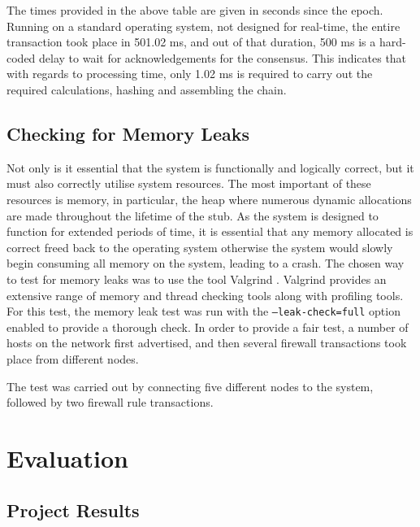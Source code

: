 \documentclass[a4paper, 11pt]{report}
\begin{document}
The times provided in the above table are given in seconds since the epoch. Running on a standard operating system, not designed for real-time, the entire transaction took place in 501.02 ms, and out of that duration, 500 ms is a hard-coded delay to wait for acknowledgements for the consensus. This indicates that with regards to processing time, only 1.02 ms is required to carry out the required calculations, hashing and assembling the chain.

\section{Checking for Memory Leaks}
Not only is it essential that the system is functionally and logically correct, but it must also correctly utilise system resources. The most important of these resources is memory, in particular, the heap where numerous dynamic allocations are made throughout the lifetime of the \gls{stub}. As the system is designed to function for extended periods of time, it is essential that any memory allocated is correct freed back to the operating system otherwise the system would slowly begin consuming all memory on the system, leading to a crash.
The chosen way to test for memory leaks was to use the tool Valgrind \cite{valgrind}. Valgrind provides an extensive range of memory and thread checking tools along with profiling tools. For this test, the memory leak test was run with the \texttt{--leak-check=full} option enabled to provide a thorough check. In order to provide a fair test, a number of hosts on the network first advertised, and then several firewall transactions took place from different nodes. 

The test was carried out by connecting five different nodes to the system, followed by two firewall rule transactions. 
\chapter{Evaluation}

\section{Project Results}
\end{document}
